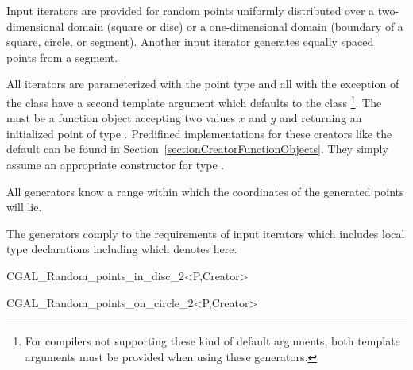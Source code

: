 \ccDefinition

Input iterators are provided for random points uniformly distributed
over a two-dimensional domain (square or disc) or a one-dimensional
domain (boundary of a square, circle, or segment). Another input
iterator generates equally spaced points from a segment.

All iterators are parameterized with the point type  and all
with the exception of the class  have a second
template argument  which defaults to the class
\footnote{%
  For compilers not supporting these kind of default arguments, both
  template arguments must be provided when using these generators.}.
The  must be a function object accepting two 
values $x$ and $y$ and returning an initialized point  of type
. Predifined implementations for these creators like the
default can be found in Section~\ref{sectionCreatorFunctionObjects}.
They simply assume an appropriate constructor for type .

All generators know a range within which the coordinates of the
generated points will lie.


\ccTypes

The generators comply to the requirements of input iterators which
includes local type declarations including  which
denotes  here.

\ccCreation


\ccHtmlNoClassFile
\begin{ccClassTemplate}{CGAL_Random_points_in_disc_2<P,Creator>}
\end{ccClassTemplate}

\ccHtmlNoClassFile
\begin{ccClassTemplate}{CGAL_Random_points_on_circle_2<P,Creator>}
\end{ccClassTemplate}

